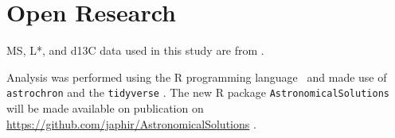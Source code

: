 \documentclass[draft]{agujournal2019}
\begin{document}


%
%

%

%



\section*{Open Research}

\Gls{MS}, \gls{L*}, and \gls{d13C} data used in this study are from .

Analysis was performed using the R programming language~\cite{RCoreTeam2020} and made use of \texttt{astrochron}  and the \texttt{tidyverse} .
The new R package \texttt{AstronomicalSolutions} will be made available on publication on \url{https://github.com/japhir/AstronomicalSolutions} .
\end{document}
